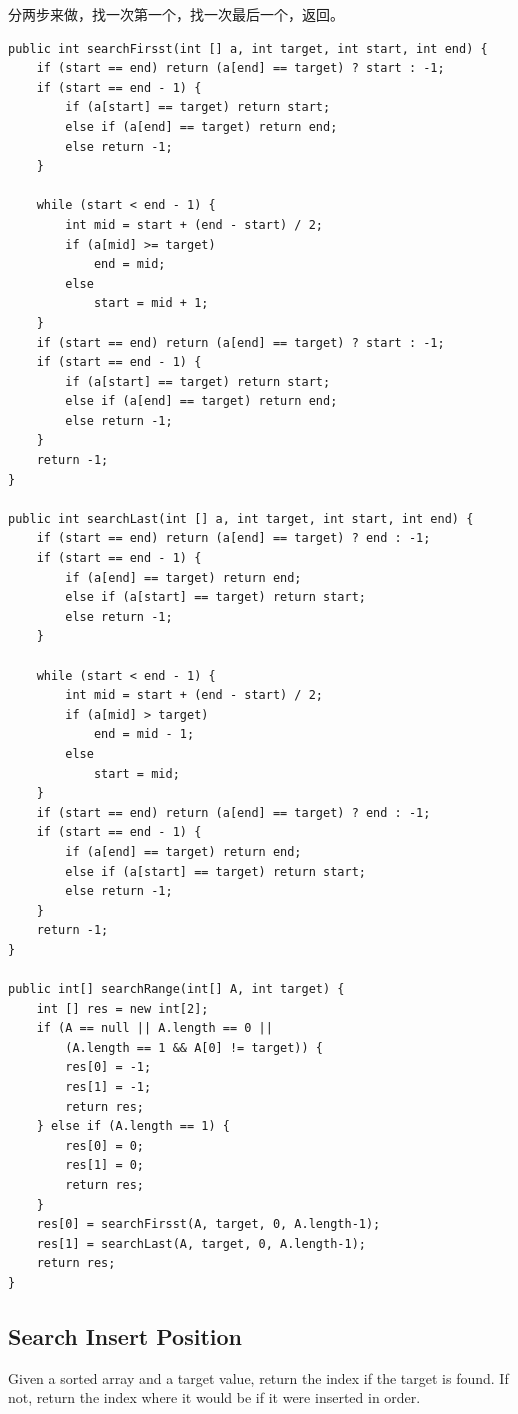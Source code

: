 \documentclass[12pt]{book}
\begin{document}
分两步来做，找一次第一个，找一次最后一个，返回。
\lstset{language=java,label= ,caption= ,numbers=none}
\begin{lstlisting}
public int searchFirsst(int [] a, int target, int start, int end) {
    if (start == end) return (a[end] == target) ? start : -1;
    if (start == end - 1) {
        if (a[start] == target) return start;
        else if (a[end] == target) return end;
        else return -1;
    }

    while (start < end - 1) {
        int mid = start + (end - start) / 2;
        if (a[mid] >= target) 
            end = mid;
        else 
            start = mid + 1;
    }
    if (start == end) return (a[end] == target) ? start : -1;
    if (start == end - 1) {
        if (a[start] == target) return start;
        else if (a[end] == target) return end;
        else return -1;
    }
    return -1;
}

public int searchLast(int [] a, int target, int start, int end) {
    if (start == end) return (a[end] == target) ? end : -1;
    if (start == end - 1) {
        if (a[end] == target) return end;        
        else if (a[start] == target) return start;
        else return -1;
    }

    while (start < end - 1) {
        int mid = start + (end - start) / 2;
        if (a[mid] > target) 
            end = mid - 1;
        else 
            start = mid;
    }
    if (start == end) return (a[end] == target) ? end : -1;
    if (start == end - 1) {
        if (a[end] == target) return end;        
        else if (a[start] == target) return start;
        else return -1;
    }
    return -1;
}

public int[] searchRange(int[] A, int target) {
    int [] res = new int[2];
    if (A == null || A.length == 0 ||
        (A.length == 1 && A[0] != target)) {
        res[0] = -1;
        res[1] = -1;
        return res;   
    } else if (A.length == 1) {
        res[0] = 0;
        res[1] = 0;
        return res;   
    }
    res[0] = searchFirsst(A, target, 0, A.length-1);
    res[1] = searchLast(A, target, 0, A.length-1);
    return res;
}
\end{lstlisting}

\subsection{Search Insert Position}
\label{sec-8-1-2}
Given a sorted array and a target value, return the index if the target is found. If not, return the index where it would be if it were inserted in order.
\end{document}
